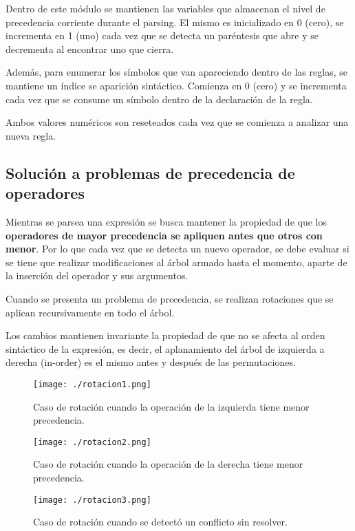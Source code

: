 Dentro de este módulo se mantienen las variables que almacenan el nivel de precedencia corriente durante el parsing. El mismo es inicializado en 0 (cero), se incrementa en 1 (uno) cada vez que se detecta un paréntesis que abre y se decrementa al encontrar uno que cierra.

Además, para enumerar los símbolos que van apareciendo dentro de las reglas, se mantiene un índice se aparición sintáctico. Comienza en 0 (cero) y se incrementa cada vez que se consume un símbolo dentro de la declaración de la regla.

Ambos valores numéricos son reseteados cada vez que se comienza a analizar una nueva regla.

\subsection{Solución a problemas de precedencia de operadores}

Mientras se parsea una expresión se busca mantener la propiedad de que los \textbf{operadores de mayor precedencia se apliquen antes que otros con menor}. Por lo que cada vez que se detecta un nuevo operador, se debe evaluar si se tiene que realizar modificaciones al árbol armado hasta el momento, aparte de la inserción del operador y sus argumentos.

Cuando se presenta un problema de precedencia, se realizan rotaciones que se aplican recursivamente en todo el árbol. 

Los cambios mantienen invariante la propiedad de que no se afecta al orden sintáctico de la expresión, es decir, el aplanamiento del árbol de izquierda a derecha (in-order) es el mismo antes y después de las permutaciones.

\begin{figure}\centering
\texttt{[image: ./rotacion1.png]}
\caption{\label{rotacion1} Caso de rotación cuando la operación de la izquierda tiene menor precedencia.}
\end{figure}

\begin{figure}\centering
\texttt{[image: ./rotacion2.png]}
\caption{\label{rotacion2} Caso de rotación cuando la operación de la derecha tiene menor precedencia.}
\end{figure}

\begin{figure}\centering
\texttt{[image: ./rotacion3.png]}
\caption{\label{rotacion3} Caso de rotación cuando se detectó un conflicto sin resolver.}
\end{figure}

